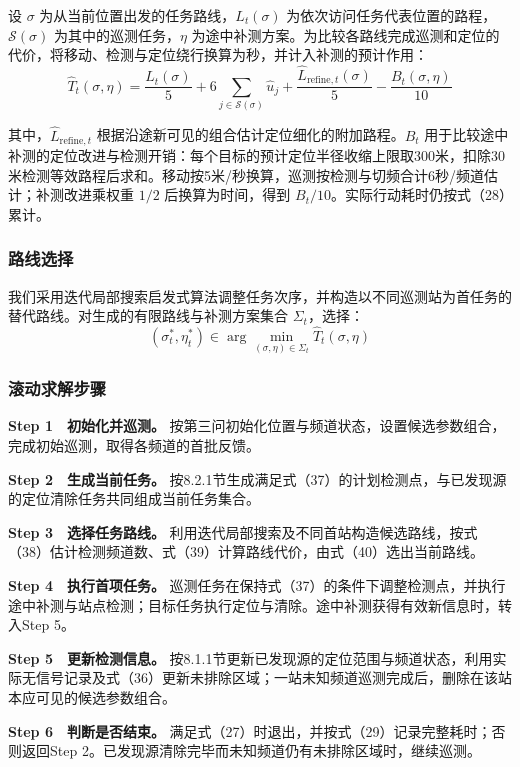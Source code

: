 设 \(\sigma\) 为从当前位置出发的任务路线，\(L_t(\sigma)\) 为依次访问任务代表位置的路程，\(\mathcal S(\sigma)\) 为其中的巡测任务，\(\eta\) 为途中补测方案。为比较各路线完成巡测和定位的代价，将移动、检测与定位绕行换算为秒，并计入补测的预计作用：
\[
\widehat T_t(\sigma,\eta)=\frac{L_t(\sigma)}5
+6\sum_{j\in\mathcal S(\sigma)}\widehat u_j
+\frac{\widehat L_{\mathrm{refine},t}(\sigma)}5
-\frac{B_t(\sigma,\eta)}{10}
\tag{39}
\]

其中，\(\widehat L_{\mathrm{refine},t}\) 根据沿途新可见的组合估计定位细化的附加路程。\(B_t\) 用于比较途中补测的定位改进与检测开销：每个目标的预计定位半径收缩上限取300米，扣除30米检测等效路程后求和。移动按5米/秒换算，巡测按检测与切频合计6秒/频道估计；补测改进乘权重 \(1/2\) 后换算为时间，得到 \(B_t/10\)。实际行动耗时仍按式（28）累计。

\subsubsection{路线选择}

我们采用迭代局部搜索启发式算法调整任务次序，并构造以不同巡测站为首任务的替代路线。对生成的有限路线与补测方案集合 \(\Sigma_t\)，选择：
\[
(\sigma_t^*,\eta_t^*)\in\arg\min_{(\sigma,\eta)\in\Sigma_t}\widehat T_t(\sigma,\eta)
\tag{40}
\]

\subsubsection{滚动求解步骤}

\textbf{Step 1　初始化并巡测。} 按第三问初始化位置与频道状态，设置候选参数组合，完成初始巡测，取得各频道的首批反馈。

\textbf{Step 2　生成当前任务。} 按8.2.1节生成满足式（37）的计划检测点，与已发现源的定位清除任务共同组成当前任务集合。

\textbf{Step 3　选择任务路线。} 利用迭代局部搜索及不同首站构造候选路线，按式（38）估计检测频道数、式（39）计算路线代价，由式（40）选出当前路线。

\textbf{Step 4　执行首项任务。} 巡测任务在保持式（37）的条件下调整检测点，并执行途中补测与站点检测；目标任务执行定位与清除。途中补测获得有效新信息时，转入Step 5。

\textbf{Step 5　更新检测信息。} 按8.1.1节更新已发现源的定位范围与频道状态，利用实际无信号记录及式（36）更新未排除区域；一站未知频道巡测完成后，删除在该站本应可见的候选参数组合。

\textbf{Step 6　判断是否结束。} 满足式（27）时退出，并按式（29）记录完整耗时；否则返回Step 2。已发现源清除完毕而未知频道仍有未排除区域时，继续巡测。

